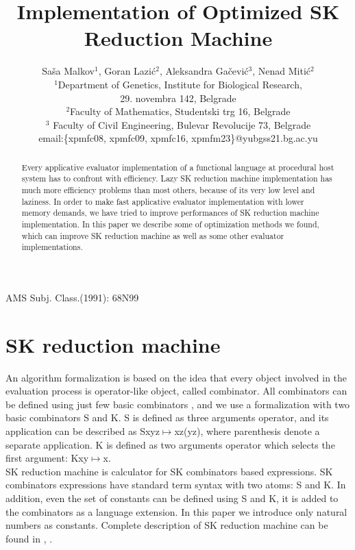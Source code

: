 \documentclass{article}
\title{Implementation of Optimized SK Reduction Machine}
\author{Sa\v sa Malkov$^1$, Goran Lazi\' c$^2$, Aleksandra Ga\v cevi\'
c$^3$, Nenad Miti\' c$^2$
\vspace{1ex}\\
$^1$Department of Genetics, Institute for Biological Research,\\ 29.
novembra  142, Belgrade\\
$^2$Faculty of Mathematics, Studentski trg 16, Belgrade\\
$^3$ Faculty of Civil Engineering, Bulevar Revolucije 73, Belgrade
\vspace{1ex}\\
email:\{xpmfc08, xpmfc09, xpmfc16, xpmfm23\}@yubgss21.bg.ac.yu}
\date{}
\def \sp{\vspace{1ex}\\}
\begin{document}
\vspace{7cm}
\maketitle
\thispagestyle{empty}
\noindent
\begin{abstract}
Every applicative evaluator implementation of a functional language
at procedural host system has to confront with efficiency. Lazy SK
reduction machine implementation has much more efficiency problems
than most others, because of its very low level and laziness. In order
to make fast applicative evaluator implementation with lower memory
demands, we have tried to improve performances of SK reduction machine
implementation. In this paper we describe some of optimization methods
we found, which can improve SK reduction machine as well as some other
evaluator implementations.
\end{abstract}
AMS Subj. Class.(1991): 68N99
\section{SK reduction machine}
An algorithm formalization is based on the idea that every object
involved in the evaluation process is operator-like object, called
combinator. All combinators can be defined using just few basic
combinators \cite{combilog}, and we use a formalization with two basic
combinators S and K. S is defined as three arguments operator, and its
application can be described as Sxyz$\mapsto$xz(yz), where parenthesis
denote a separate application. K is defined as two arguments operator
which selects the first argument: Kxy$\mapsto$x.
\sp
SK reduction machine is calculator for SK combinators based expressions.
SK combinators expressions have standard term syntax with two atoms:
S and K. In addition, even the set of constants can be defined using
S and K, it is added to the combinators as a language extension. In
this paper we introduce only natural numbers as constants. Complete
description of SK reduction machine can be found in \cite{funcprog},
\cite{implet}.
\end{document}
